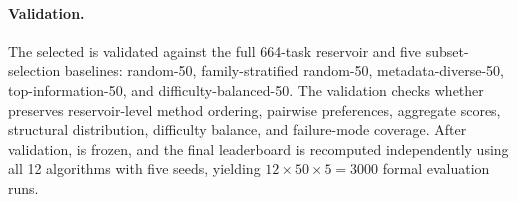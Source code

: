 \paragraph{Validation.}
The selected \core{} is validated against the full 664-task reservoir and five subset-selection baselines: random-50, family-stratified random-50, metadata-diverse-50, top-information-50, and difficulty-balanced-50. The validation checks whether \core{} preserves reservoir-level method ordering, pairwise preferences, aggregate scores, structural distribution, difficulty balance, and failure-mode coverage. After validation, \core{} is frozen, and the final leaderboard is recomputed independently using all 12 algorithms with five seeds, yielding \(12 \times 50 \times 5 = 3000\) formal evaluation runs.
